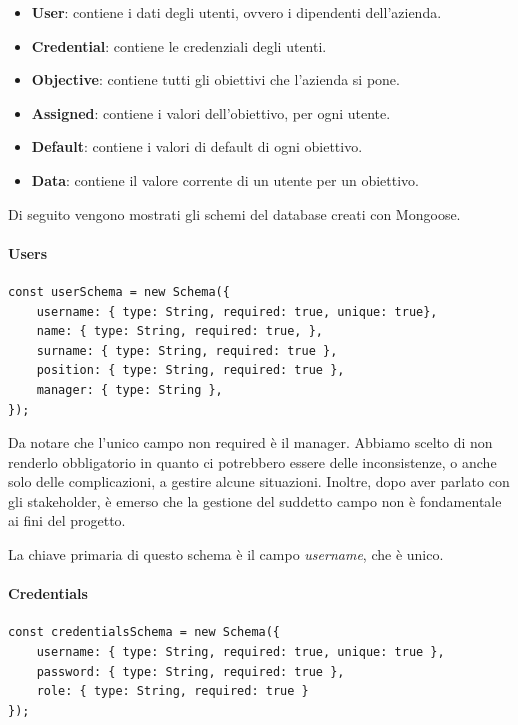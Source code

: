 \begin{itemize}
    \item \textbf{User}: contiene i dati degli utenti, ovvero i dipendenti dell'azienda.
    \item \textbf{Credential}: contiene le credenziali degli utenti.
    \item \textbf{Objective}: contiene tutti gli obiettivi che l'azienda si pone.
    \item \textbf{Assigned}: contiene i valori dell'obiettivo, per ogni utente.
    \item \textbf{Default}: contiene i valori di default di ogni obiettivo.
    \item \textbf{Data}: contiene il valore corrente di un utente per un obiettivo.
\end{itemize}

Di seguito vengono mostrati gli schemi del database creati con Mongoose.

\paragraph{Users}

\begin{verbatim}
const userSchema = new Schema({
    username: { type: String, required: true, unique: true},
    name: { type: String, required: true, },
    surname: { type: String, required: true },
    position: { type: String, required: true },
    manager: { type: String },
});
\end{verbatim}

Da notare che l'unico campo non required è il manager. Abbiamo scelto di non renderlo obbligatorio in quanto
ci potrebbero essere delle inconsistenze, o anche solo delle complicazioni, a gestire alcune situazioni.
Inoltre, dopo aver parlato con gli stakeholder, è emerso che la gestione del suddetto campo non è fondamentale 
ai fini del progetto.

La chiave primaria di questo schema è il campo \textit{username}, che è unico.

\paragraph{Credentials}

\begin{verbatim}
const credentialsSchema = new Schema({
    username: { type: String, required: true, unique: true },
    password: { type: String, required: true },
    role: { type: String, required: true }
});
\end{verbatim}

